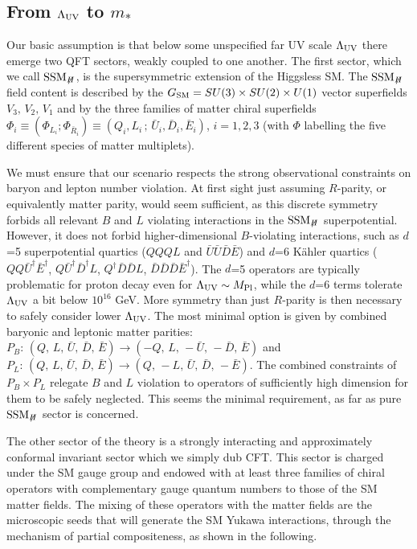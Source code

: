 \documentclass[a4paper,12pt]{article}
\def\LUV{\Lambda_{\rm UV}}
\def\mst{m_*}
\def\SSMnH{{\rm SSM}_{H \!\!\!\!\!\not\,\,\,\,\,}}
\begin{document}
\boldmath
\subsection{From $\LUV$ to $\mst$}
\unboldmath
\label{UVtostar}

Our basic assumption is that below some unspecified far UV scale 
 $\LUV$ there emerge two QFT sectors, weakly coupled to one another.
The first sector, which we call  $\SSMnH$, is the supersymmetric extension of the Higgsless SM. The $\SSMnH$  field content is described by   the $G_{\rm SM}=SU(3)\times SU(2)\times U(1)$ vector superfields $V_3,\,V_2,\, V_1$ and by the three families of matter chiral superfields $\Phi_i\equiv (\Phi_{L_i}; \Phi_{{\bar R}_i})\equiv (Q_i,L_i \, ; \,\bar U_i,\bar D_i, \bar E_i)$, $i=1,2,3$ (with $\Phi$ labelling the five  different species of matter multiplets).

We must ensure that our scenario respects the strong observational constraints on baryon and lepton number violation.
 At first sight just assuming $R$-parity, or equivalently matter parity, would seem sufficient, as this discrete symmetry forbids all relevant $B$ and $L$ violating interactions in the $\SSMnH$ superpotential. However, it does not forbid higher-dimensional $B$-violating interactions, such as $d$=5 superpotential quartics ($QQQL$ and $\bar U\bar U\bar D\bar E$) and $d$=6 K\"ahler quartics  ($QQ\bar U^\dagger \bar E^\dagger$, $Q\bar U^\dagger \bar D^\dagger L$, $Q^\dagger\bar D \bar D L$, $\bar D \bar D \bar D \bar E^\dagger$). The $d$=5 operators are typically problematic for proton decay even for  $\LUV \sim M_{ \rm Pl }$, while the $d$=6 terms tolerate $\LUV$ a bit below $10^{16}$ GeV. More symmetry
than just  $R$-parity is then necessary to safely consider lower $\LUV$. The most minimal option  is given by combined baryonic and leptonic matter parities:
  $P_B: \,(Q,\,L,\,\bar U,\, \bar D,\,\bar E)\to (-Q,\,L,\,-\bar U,\, -\bar D,\,\bar E)$ and $P_L: \,(Q,\,L,\,\bar U,\, \bar D,\,\bar E)\to (Q,\,-L,\,\bar U,\, \bar D,\,-\bar E)$. The combined constraints of $P_B\times P_L$ relegate  $B$ and  $L$ violation to operators of sufficiently high dimension for them to be safely neglected.
This seems the minimal requirement, as far as pure $\SSMnH$ sector is concerned.
  
  
The other sector of the theory is a strongly interacting and approximately conformal invariant sector which we simply dub CFT. This sector is charged under the SM gauge group and endowed with at least three families of chiral operators with complementary gauge quantum numbers to those of the SM matter fields. 
The mixing of these operators with the matter fields are the microscopic seeds that will generate the SM Yukawa interactions, through the mechanism of partial compositeness, as shown in the following.
\end{document}
